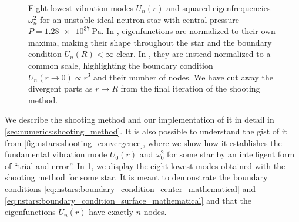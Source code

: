 \begin{figure}
\caption{\label{fig:nstars:modes}%
Eight lowest vibration modes $U_n(r)$ and squared eigenfrequencies $\omega_n^2$ for an unstable ideal neutron star with central pressure $P = \SI{1.28e37}{\pascal}$.
In , eigenfunctions are normalized to their own maxima, making their shape throughout the star and the boundary condition $U_n(R) < \infty$ clear.
In , they are instead normalized to a common scale, highlighting the boundary condition $U_n(r \rightarrow 0) \propto r^3$ and their number of nodes.
We have cut away the divergent parts as $r \rightarrow R$ from the final iteration of the shooting method.
}
\end{figure}

We describe the shooting method and our implementation of it in detail in \cref{sec:numerics:shooting_method}.
It is also possible to understand the gist of it from \cref{fig:nstars:shooting_convergence}, where we show how it establishes the fundamental vibration mode $U_0(r)$ and $\omega_0^2$ for some star by an intelligent form of ``trial and error''.
In \cref{fig:nstars:modes}, we display the eight lowest modes obtained with the shooting method for some star.
It is meant to demonstrate the boundary conditions \eqref{eq:nstars:boundary_condition_center_mathematical} and \eqref{eq:nstars:boundary_condition_surface_mathematical} and that the eigenfunctions $U_n(r)$ have exactly $n$ nodes.

